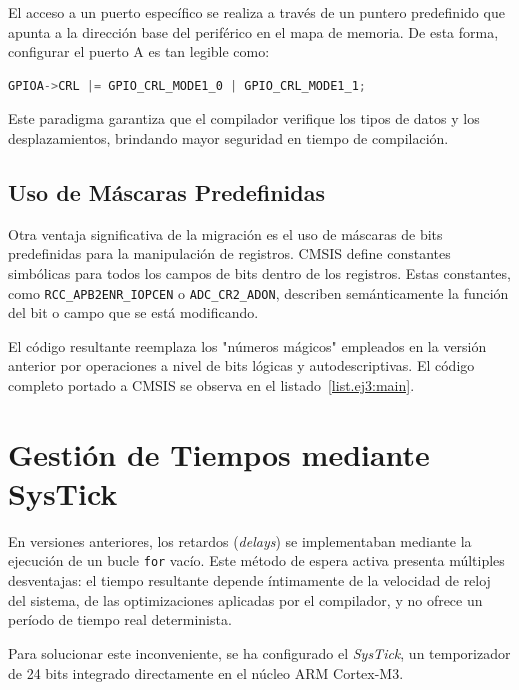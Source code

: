El acceso a un puerto específico se realiza a través de un puntero predefinido que apunta a la dirección
base del periférico en el mapa de memoria. De esta forma, configurar el puerto A es tan legible como:
\begin{lstlisting}[language=C]
GPIOA->CRL |= GPIO_CRL_MODE1_0 | GPIO_CRL_MODE1_1;
\end{lstlisting}

Este paradigma garantiza que el compilador verifique los tipos de datos y los desplazamientos, brindando
mayor seguridad en tiempo de compilación.

\subsection{Uso de Máscaras Predefinidas}

Otra ventaja significativa de la migración es el uso de máscaras de bits predefinidas para la manipulación
de registros. CMSIS define constantes simbólicas para todos los campos de bits dentro de los registros.
Estas constantes, como \lstinline{RCC_APB2ENR_IOPCEN} o \lstinline{ADC_CR2_ADON}, describen semánticamente
la función del bit o campo que se está modificando.

El código resultante reemplaza los "números mágicos" empleados en la versión anterior por operaciones
a nivel de bits lógicas y autodescriptivas. El código completo portado a CMSIS se observa en el listado~\ref{list.ej3:main}.



\section{Gestión de Tiempos mediante SysTick}
\label{sec.ej3:systick}

En versiones anteriores, los retardos (\textit{delays}) se implementaban mediante la ejecución de un bucle
\lstinline{for} vacío. Este método de espera activa presenta múltiples desventajas: el tiempo
resultante depende íntimamente de la velocidad de reloj del sistema, de las optimizaciones aplicadas por
el compilador, y no ofrece un período de tiempo real determinista.

Para solucionar este inconveniente, se ha configurado el \textit{SysTick}, un temporizador de 24 bits
integrado directamente en el núcleo ARM Cortex-M3.

